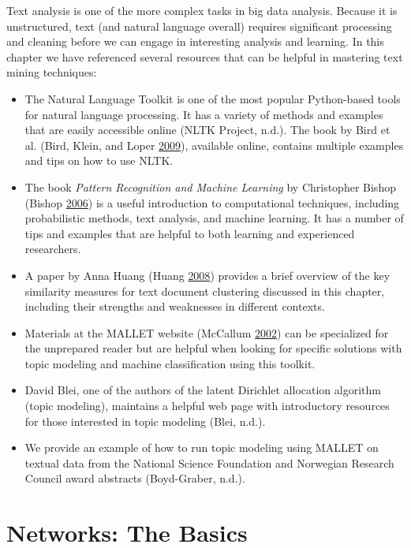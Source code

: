 \documentclass[]{krantz}
\begin{document}
Text analysis is one of the more complex tasks in big data analysis.
Because it is unstructured, text (and natural language overall) requires
significant processing and cleaning before we can engage in interesting
analysis and learning. In this chapter we have referenced several
resources that can be helpful in mastering text mining techniques:

\begin{itemize}
\item
  The Natural Language Toolkit is one of the most popular Python-based
  tools for natural language processing. It has a variety of methods and
  examples that are easily accessible online (NLTK Project, n.d.). The
  book by Bird et al. (Bird, Klein, and Loper
  \protect\hyperlink{ref-bird-09}{2009}), available online, contains
  multiple examples and tips on how to use NLTK.
\item
  The book \emph{Pattern Recognition and Machine Learning} by
  Christopher Bishop (Bishop \protect\hyperlink{ref-bishop-06}{2006}) is
  a useful introduction to computational techniques, including
  probabilistic methods, text analysis, and machine learning. It has a
  number of tips and examples that are helpful to both learning and
  experienced researchers.
\item
  A paper by Anna Huang (Huang \protect\hyperlink{ref-huang-08}{2008})
  provides a brief overview of the key similarity measures for text
  document clustering discussed in this chapter, including their
  strengths and weaknesses in different contexts.
\item
  Materials at the MALLET website (McCallum
  \protect\hyperlink{ref-mallet}{2002}) can be specialized for the
  unprepared reader but are helpful when looking for specific solutions
  with topic modeling and machine classification using this toolkit.
\item
  David Blei, one of the authors of the latent Dirichlet allocation
  algorithm (topic modeling), maintains a helpful web page with
  introductory resources for those interested in topic modeling (Blei,
  n.d.).
\item
  We provide an example of how to run topic modeling using MALLET on
  textual data from the National Science Foundation and Norwegian
  Research Council award abstracts (Boyd-Graber, n.d.).
\end{itemize}

\hypertarget{chap:networks}{\chapter{Networks: The
Basics}\label{chap:networks}}
\end{document}
